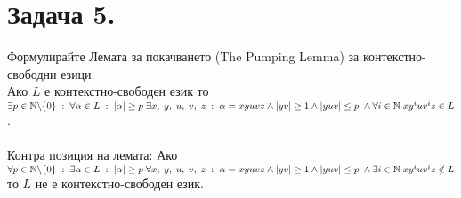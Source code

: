 \documentclass[12pt]{article}
\newcommand{\N}{\mathbb{N}}
\begin{document}
\section{Задача 5.}

Формулирайте Лемата за покачването (The Pumping Lemma) за контекстно-свободни езици. \\

Ако $L$ е контекстно-свободен език то \\

$\exists p \in \N \backslash \{0\} \; : \; \forall \alpha \in L \; : \; |\alpha| \geq p \; \exists x, \; y, \; u, \; v, \; z \; : \; \alpha = xyuvz \land |yv| \geq 1 \land |yuv| \leq p \; \land \\
\forall i \in \N \; xy^iuv^iz \in L$. \\\\

Контра позиция на лемата: Ако \\

$\forall p \in \N \backslash \{0\} \; : \; \exists \alpha \in L \; : \; |\alpha| \geq p \; \forall x, \; y, \; u, \; v, \; z \; : \; \alpha = xyuvz \land |yv| \geq 1 \land |yuv| \leq p \; \land \\
\exists i \in \N \; xy^iuv^iz \notin L$ то $L$ не е контекстно-свободен език.
\end{document}
